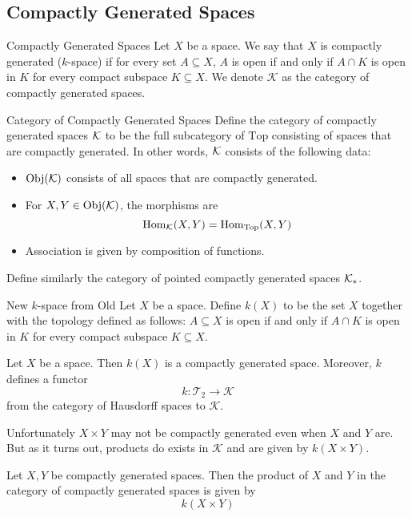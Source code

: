 \documentclass[a4paper]{article}
\begin{document}
\subsection{Compactly Generated Spaces}
\begin{defn}{Compactly Generated Spaces}{} Let $X$ be a space. We say that $X$ is compactly generated ($k$-space) if for every set $A\subseteq X$, $A$ is open if and only if $A\cap K$ is open in $K$ for every compact subspace $K\subseteq X$. We denote $\mathcal{K}$ as the category of compactly generated spaces. 
\end{defn}

\begin{defn}{Category of Compactly Generated Spaces}{} Define the category of compactly generated spaces $\mathcal{K}$ to be the full subcategory of $\text{Top}$ consisting of spaces that are compactly generated. In other words, $\mathcal{K}$ consists of the following data: 
\begin{itemize}
\item $\text{Obj}(\mathcal{K})$ consists of all spaces that are compactly generated. 
\item For $X,Y\in\text{Obj}(\mathcal{K})$, the morphisms are $$\operatorname{Hom}_{\mathcal{K}}(X,Y)=\operatorname{Hom}_{\text{Top}}(X,Y)$$
\item Association is given by composition of functions. 
\end{itemize}
Define similarly the category of pointed compactly generated spaces $\mathcal{K}_\ast$. 
\end{defn}

\begin{defn}{New $k$-space from Old}{} Let $X$ be a space. Define $k(X)$ to be the set $X$ together with the topology defined as follows: $A\subseteq X$ is open if and only if $A\cap K$ is open in $K$ for every compact subspace $K\subseteq X$. 
\end{defn}

\begin{lmm}{}{} Let $X$ be a space. Then $k(X)$ is a compactly generated space. Moreover, $k$ defines a functor $$k:\mathcal{T}_2\to\mathcal{K}$$ from the category of Hausdorff spaces to $\mathcal{K}$. 
\end{lmm}

Unfortunately $X\times Y$ may not be compactly generated even when $X$ and $Y$ are. But as it turns out, products do exists in $\mathcal{K}$ and are given by $k(X\times Y)$. 

\begin{prp}{}{} Let $X,Y$ be compactly generated spaces. Then the product of $X$ and $Y$ in the category of compactly generated spaces is given by $$k(X\times Y)$$
\end{prp}
\end{document}
